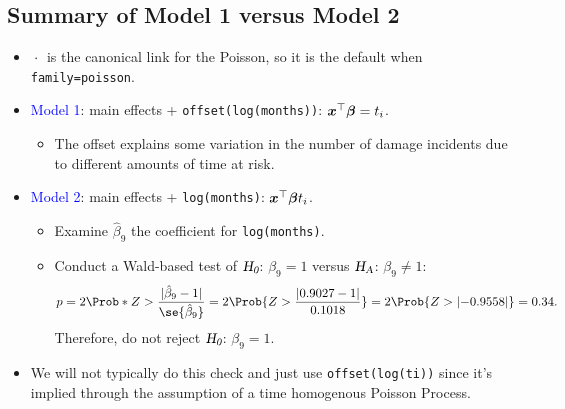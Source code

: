 \documentclass{article}\usepackage[]{graphicx}\usepackage[svgnames]{xcolor}
\let\log\relax%
\newcommand{\HN}{\textsl{H}_{\textsl{0}}}%
\newcommand{\HA}{\textsl{H}_{\textsl{A}}}%
\DeclarePairedDelimiter\abs{\lvert}{\rvert}
\providecommand{\Vector}[1]{\bm{#1}}%
\begin{document}
\subsection*{Summary of Model 1 versus Model 2}
\begin{itemize}
      \item $ \log{\:\cdot\:} $ is the canonical link for the Poisson, so it is the default when \texttt{family=poisson}.
      \item \textcolor{Blue}{Model 1}: main effects + \texttt{offset(log(months))}: $ \Vector{x}^\top \Vector{\beta}=\log{t_i} $.
            \begin{itemize}
                  \item The offset explains some variation in the number of damage incidents due to
                        different amounts of time at risk.
            \end{itemize}
      \item \textcolor{Blue}{Model 2}: main effects + \texttt{log(months)}: $ \Vector{x}^\top \Vector{\beta}\log{t_i} $.
            \begin{itemize}
                  \item Examine $ \hat{\beta}_9 $ the coefficient for \texttt{log(months)}.
                  \item Conduct a Wald-based test of $ \HN $: $ \beta_9=1 $ versus $ \HA $: $ \beta_9\ne 1 $:
                        \[ p=2\Prob*{Z>\frac{\abs{\hat{\beta}_9-1}}{\se{\hat{\beta}_9}}}=2\Prob{Z>\frac{\abs{0.9027-1}}{0.1018}}=2\Prob{Z>\abs{-0.9558}}=0.34. \]
                        Therefore, do not reject $ \HN $: $ \beta_9=1 $.
            \end{itemize}
      \item We will not typically do this check and just use \texttt{offset(log(ti))} since it's implied
            through the assumption of a time homogenous Poisson Process.
\end{itemize}
\end{document}
